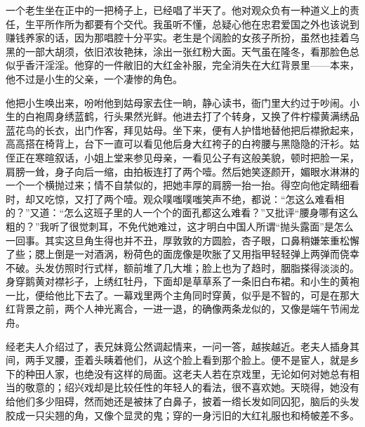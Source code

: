 \par 一个老生坐在正中的一把椅子上，已经唱了半天了。他对观众负有一种道义上的责任，生平所作所为都要有个交代。我虽听不懂，总疑心他在忠君爱国之外也该说到赚钱养家的话，因为那唱腔十分平实。老生是个阔脸的女孩子所扮，虽然也挂着乌黑的一部大胡须，依旧浓妆艳抹，涂出一张红粉大面。天气虽在隆冬，看那脸色总似乎香汗淫淫。他穿的一件敝旧的大红金补服，完全消失在大红背景里——本来，他不过是小生的父亲，一个凄惨的角色。
\par 他把小生唤出来，吩咐他到姑母家去住一晌，静心读书，衙门里大约过于吵闹。小生的白袍周身绣蓝鹤，行头果然光鲜。他进去打了个转身，又换了件柠檬黄满绣品蓝花鸟的长衣，出门作客，拜见姑母。坐下来，便有人护惜地替他把后襟掀起来，高高搭在椅背上，台下一直可以看见他后身大红袴子的白袴腰与黑隐隐的汗衫。姑侄正在寒暄叙话，小姐上堂来参见母亲，一看见公子有这般美貌，顿时把脸一呆，肩膀一耸，身子向后一缩，由拍板连打了两个噎。然后她笑逐颜开，媚眼水淋淋的一个一个横抛过来；情不自禁似的，把她丰厚的肩膀一抬一抬。得空向他定睛细看时，却又吃惊，又打了两个噎。观众噗嗤噗嗤笑声不绝，都说：“怎这么难看相的？”又道：“怎么这班子里的人一个个的面孔都这么难看？”又批评“腰身哪有这么粗的？”我听了很觉刺耳，不免代她难过，这才明白中国人所谓“抛头露面”是怎么一回事。其实这旦角生得也并不丑，厚敦敦的方圆脸，杏子眼，口鼻稍嫌笨重松懈了些；腮上倒是一对酒涡，粉荷色的面庞像是吹胀了又用指甲轻轻弹上两弹而侥幸不破。头发仿照时行式样，额前堆了几大堆；脸上也为了趋时，胭脂搽得淡淡的。身穿鹅黄对襟衫子，上绣红牡丹，下面却是草草系了一条旧白布裙。和小生的黄袍一比，便给他比下去了。一幕戏里两个主角同时穿黄，似乎是不智的，可是在那大红背景之前，两个人神光离合，一进一退，的确像两条龙似的，又像是端午节闹龙舟。
\par 经老夫人介绍过了，表兄妹竟公然调起情来，一问一答，越挨越近。老夫人插身其间，两手叉腰，歪着头眱着他们，从这个脸上看到那个脸上。便不是宦人，就是乡下的种田人家，也绝没有这样的局面。这老夫人若在京戏里，无论如何对她总有相当的敬意的；绍兴戏却是比较任性的年轻人的看法，很不喜欢她。天晓得，她没有给他们多少阻碍，然而她还是被抹了白鼻子，披着一绺长发如同囚犯，脑后的头发胶成一只尖翘的角，又像个显灵的鬼；穿的一身污旧的大红礼服也和椅帔差不多。
